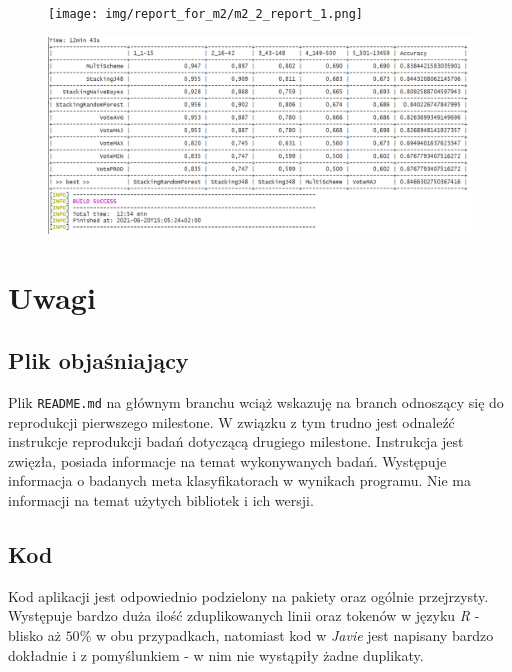 \documentclass[graybox]{svmult}
\def\code#1{\texttt{#1}}
\begin{document}
\begin{figure}[!h]
\centering
\texttt{[image: img/report\_for\_m2/m2\_2\_report\_1.png]}
\end{figure}

\begin{figure}[!h]
\centering
\includegraphics[width=\linewidth]{img/report_for_m2/m2_2_report_2.png}
\end{figure}


\clearpage

\section{Uwagi}

\subsection{Plik objaśniający}
Plik \code{README.md} na głównym branchu wciąż wskazuję na branch odnoszący się do reprodukcji pierwszego milestone. W związku z tym trudno jest odnaleźć instrukcje reprodukcji badań dotyczącą drugiego milestone. Instrukcja jest zwięzła, posiada informacje na temat wykonywanych badań. Występuje informacja o badanych meta klasyfikatorach w wynikach programu. Nie ma informacji na temat użytych bibliotek i ich wersji.

\subsection{Kod}

Kod aplikacji jest odpowiednio podzielony na pakiety oraz ogólnie przejrzysty. Występuje bardzo duża ilość zduplikowanych linii oraz tokenów w języku \emph{R} - blisko aż $50\%$ w obu przypadkach, natomiast kod w \emph{Javie} jest napisany bardzo dokładnie i z pomyślunkiem - w nim nie wystąpiły żadne duplikaty.
\end{document}
